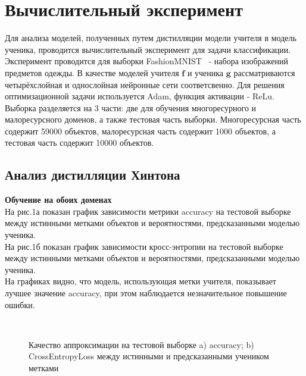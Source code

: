 \newpage

\section{Вычислительный эксперимент}

Для анализа моделей, полученных путем дистилляции модели учителя в модель ученика, проводится вычислительный эксперимент для задачи классификации.\\
Эксперимент проводится для выборки FashionMNIST~\cite{FMNIST} - набора изображений предметов одежды. В качестве моделей учителя $\textbf{f}$ и ученика $\textbf{g}$ рассматриваются четырёхслойная и однослойная нейронные сети соответсвенно. Для решения оптимизационной задачи используется Adam, функция активации - ReLu.\\
Выборка разделяется на 3 части: две для обучения многоресурного и малоресурсного доменов, а также тестовая часть выборки. Многоресурсная часть содержит 59000 объектов, малоресурсная часть содержит 1000 объектов, а тестовая часть содержит 10000 объектов.
\newpage
\subsection{Анализ дистилляции Хинтона}

\textbf{Обучение на обоих доменах}\\
На рис.1а показан график зависимости метрики accuracy на тестовой выборке между истинными метками объектов и вероятностями, предсказанными моделью ученика.\\
На рис.1б показан график зависимости кросс-энтропии на тестовой выборке между истинными метками объектов и вероятностями, предсказанными моделью ученика.\\
На графиках видно, что модель, использующая метки учителя, показывает лучшее значение accuracy, при этом наблюдается незначительное повышение ошибки.
\begin{figure}[h!t]\center
{}
\\
\caption{Качество аппроксимации на тестовой выборке a) accuracy; b) CrossEntropyLoss между истинными и предсказанными учеником метками}
\end{figure}

